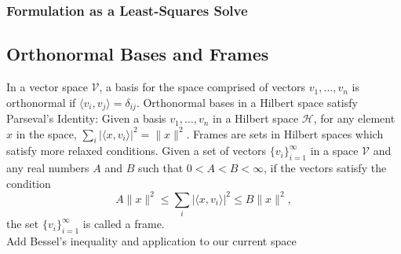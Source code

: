 \documentclass[11pt]{amsart}
\begin{document}
\subsubsection{Formulation as a Least-Squares Solve}


\subsection{Orthonormal Bases and Frames} 
In a vector space $\mathcal{V}$, a basis for the space comprised of vectors $v_1,\ldots,v_n$ is orthonormal if $\langle v_i,v_j\rangle = \delta_{ij}$. Orthonormal bases in a Hilbert space satisfy Parseval's Identity: Given a basis $v_1,\ldots,v_n$ in a Hilbert space $\mathcal{H}$, for any element $x$ in the space, $\displaystyle \sum_i |\langle x,v_i \rangle |^2 = \|x\|^2$.
Frames are sets in Hilbert spaces which satisfy more relaxed conditions. Given a set of vectors $\{v_i\}_{i=1}^{\infty}$ in a space $\mathcal{V}$ and any real numbers $A$ and $B$ such that $0<A<B<\infty$, if the vectors satisfy the condition
\begin{equation}
A\|x\|^2\leq \sum_{i} | \langle x,v_i \rangle |^2 \leq B \|x\|^2,
\end{equation} the set $\{v_i\}_{i=1}^{\infty}$ is called a frame.  \\

Add Bessel's inequality and application to our current space
\end{document}
